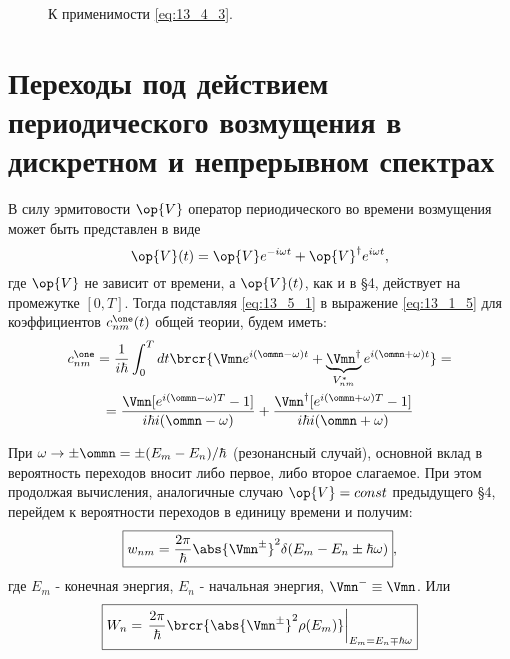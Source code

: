 \begin{figure}[h!]
\centering
{}
\caption{К применимости \eqref{eq:13_4_3}.} \label{fig:13_4}
\end{figure}

\section{Переходы под действием периодического возмущения в дискретном и непрерывном спектрах}

В силу эрмитовости $\op{V}$ оператор периодического во времени возмущения может быть представлен в виде
\begin{equation}
\label{eq:13_5_1}
\op{V}(t) = \op{V}e^{-i\omega t} + \op{V}^\dag e^{i\omega t},
\end{equation}
где $\op{V}$ не зависит от времени, а $\op{V}(t)$, как и в \S 4, действует на промежутке $[0, T]$. Тогда подставляя \eqref{eq:13_5_1} в выражение \eqref{eq:13_1_5} для коэффициентов $c_{nm}^\one (t)$ общей теории, будем иметь:
\begin{gather*}
c_{nm}^\one = \frac{1}{i \hbar} \int_0^T dt \brcr{\Vmn e^{i(\ommn - \omega)t} + \underbrace{\Vmn^\dag}_{V_{nm}^*} e^{i(\ommn + \omega)t}} = \\
= \frac{\Vmn [e^{i(\ommn - \omega)T} - 1]}{i \hbar i (\ommn - \omega)} + \frac{\Vmn^\dag [e^{i(\ommn + \omega)T} - 1]}{i \hbar i (\ommn + \omega)}
\end{gather*}

При $\omega \to \pm \ommn = \pm (E_m - E_n) / \hbar$ (резонансный случай), основной вклад в вероятность переходов вносит либо первое, либо второе слагаемое. При этом продолжая вычисления, аналогичные случаю $\op{V} = const$ предыдущего \S 4, перейдем к вероятности переходов в единицу времени и получим:
\begin{equation}
\label{eq:13_5_2}
\boxed{w_{nm} = \frac{2\pi}{\hbar} \abs{\Vmn^\pm}^2 \delta(E_m - E_n \pm \hbar \omega)}, 
\end{equation}
где $E_m$ - конечная энергия, $E_n$ - начальная энергия, $\Vmn^- \equiv \Vmn$. Или
\begin{equation}
\label{eq:13_5_3}
\boxed{W_n = \left .\frac{2\pi}{\hbar} \brcr{\abs{\Vmn^\pm}^2 \rho(E_m)} \right |_{E_m = E_n \mp \hbar \omega}} 
\end{equation}

